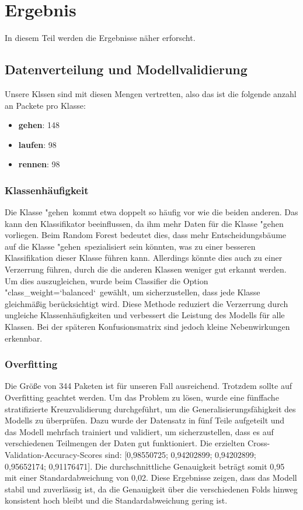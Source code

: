 \chapter{Ergebnis}
In diesem Teil werden die Ergebnisse näher erforscht.

\section{Datenverteilung und Modellvalidierung}
Unsere Klssen sind mit diesen Mengen vertretten, also das ist die folgende anzahl an Packete pro Klasse:

\begin{itemize}
	\item \textbf{gehen}: 148
	\item \textbf{laufen}: 98
	\item \textbf{rennen}: 98
\end{itemize}

\subsection{Klassenhäufigkeit}
Die Klasse "gehen\dq\, kommt etwa doppelt so häufig vor wie die beiden anderen. Das kann den Klassifikator beeinflussen, da ihm mehr Daten für die Klasse "gehen\dq\, vorliegen. Beim Random Forest bedeutet dies, dass mehr Entscheidungsbäume auf die Klasse "gehen\dq\, spezialisiert sein könnten, was zu einer besseren Klassifikation dieser Klasse führen kann. Allerdings könnte dies auch zu einer Verzerrung führen, durch die die anderen Klassen weniger gut erkannt werden. Um dies auszugleichen, wurde beim Classifier die Option "class\_weight=‘balanced‘\dq\, gewählt, um sicherzustellen, dass jede Klasse gleichmäßig berücksichtigt wird. Diese Methode reduziert die Verzerrung durch ungleiche Klassenhäufigkeiten und verbessert die Leistung des Modells für alle Klassen. Bei der späteren Konfusionsmatrix sind jedoch kleine Nebenwirkungen erkennbar.

\subsection{Overfitting}
Die Größe von 344 Paketen ist für unseren Fall ausreichend. Trotzdem sollte auf Overfitting geachtet werden. Um das Problem zu lösen, wurde eine fünffache stratifizierte Kreuzvalidierung durchgeführt, um die Generalisierungsfähigkeit des Modells zu überprüfen. Dazu wurde der Datensatz in fünf Teile aufgeteilt und das Modell mehrfach trainiert und validiert, um sicherzustellen, dass es auf verschiedenen Teilmengen der Daten gut funktioniert. Die erzielten Cross-Validation-Accuracy-Scores sind: [0,98550725; 0,94202899; 0,94202899; 0,95652174; 0,91176471]. Die durchschnittliche Genauigkeit beträgt somit 0,95 mit einer Standardabweichung von 0,02.
Diese Ergebnisse zeigen, dass das Modell stabil und zuverlässig ist, da die Genauigkeit über die verschiedenen Folds hinweg konsistent hoch bleibt und die Standardabweichung gering ist.

